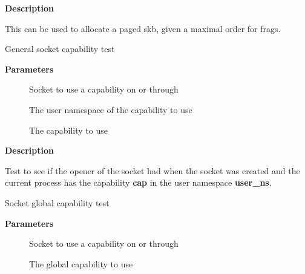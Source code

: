 \documentclass[a4paper,8pt,english]{sphinxmanual}
\begin{document}
\textbf{Description}

This can be used to allocate a paged skb, given a maximal order for frags.

\begin{fulllineitems}
\label{networking/kapi:c.sk_ns_capable}
General socket capability test

\end{fulllineitems}


\textbf{Parameters}
\begin{description}
\item[{}] \leavevmode
Socket to use a capability on or through

\item[{}] \leavevmode
The user namespace of the capability to use

\item[{}] \leavevmode
The capability to use

\end{description}

\textbf{Description}

Test to see if the opener of the socket had when the socket was
created and the current process has the capability \textbf{cap} in the user
namespace \textbf{user\_ns}.

\begin{fulllineitems}
\label{networking/kapi:c.sk_capable}
Socket global capability test

\end{fulllineitems}


\textbf{Parameters}
\begin{description}
\item[{}] \leavevmode
Socket to use a capability on or through

\item[{}] \leavevmode
The global capability to use

\end{description}
\end{document}
